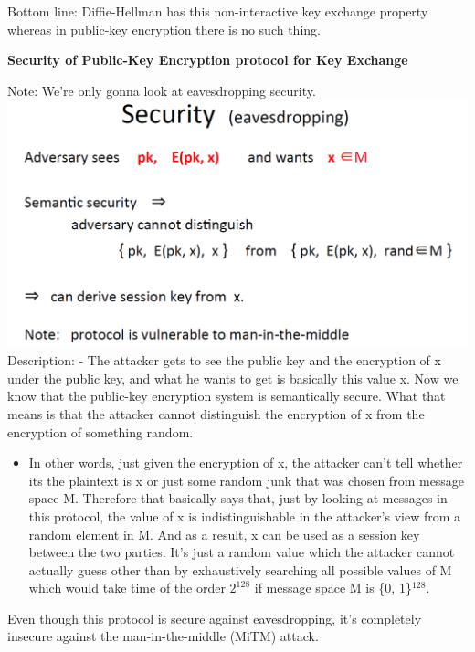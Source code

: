 \documentclass[11pt]{article}
\makeatletter
\def\maxwidth{\ifdim\Gin@nat@width>\linewidth\linewidth
    \else\Gin@nat@width\fi}
\let\Oldincludegraphics\includegraphics
\renewcommand{\includegraphics}[1]{\Oldincludegraphics[width=.8\maxwidth]{#1}}
\providecommand{\tightlist}{%
      \setlength{\itemsep}{0pt}\setlength{\parskip}{0pt}}
\makeatother
\begin{document}
Bottom line: Diffie-Hellman has this non-interactive key exchange
property whereas in public-key encryption there is no such thing.

\textbf{Security of Public-Key Encryption protocol for Key Exchange}

Note: We're only gonna look at eavesdropping security.
\includegraphics{./Images/Security-PKE-KeyEx.png} Description: - The
attacker gets to see the public key and the encryption of x under the
public key, and what he wants to get is basically this value x. Now we
know that the public-key encryption system is semantically secure. What
that means is that the attacker cannot distinguish the encryption of x
from the encryption of something random.

\begin{itemize}
\tightlist
\item
  In other words, just given the encryption of x, the attacker can't
  tell whether its the plaintext is x or just some random junk that was
  chosen from message space M. Therefore that basically says that, just
  by looking at messages in this protocol, the value of x is
  indistinguishable in the attacker's view from a random element in M.
  And as a result, x can be used as a session key between the two
  parties. It's just a random value which the attacker cannot actually
  guess other than by exhaustively searching all possible values of M
  which would take time of the order \(2^{128}\) if message space M is
  \{0, 1\}\(^{128}\).
\end{itemize}

Even though this protocol is secure against eavesdropping, it's
completely insecure against the man-in-the-middle (MiTM) attack.
\end{document}

